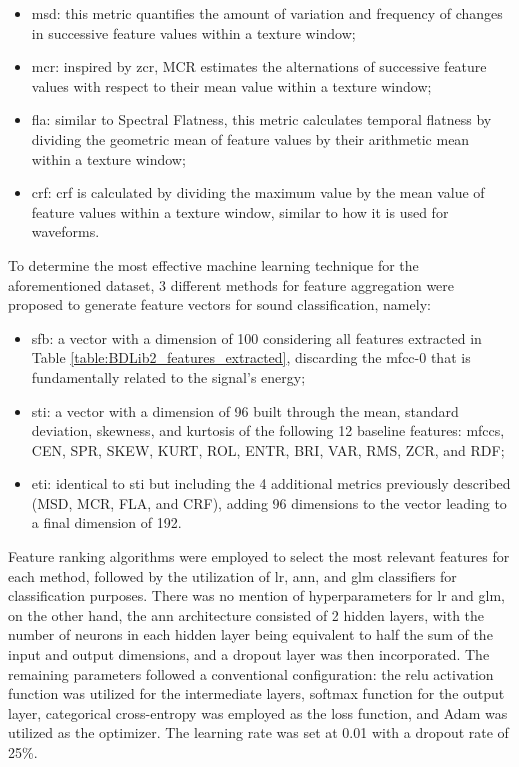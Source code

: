  \begin{itemize}
    \item \gls{msd}: this metric quantifies the amount of variation and frequency of changes in successive feature values within a texture window;
    \item \gls{mcr}: inspired by \gls{zcr}, MCR estimates the alternations of successive feature values with respect to their mean value within a texture window;
    \item \gls{fla}: similar to Spectral Flatness, this metric calculates temporal flatness by dividing the geometric mean of feature values by their arithmetic mean within a texture window;
    \item \gls{crf}:  \gls{crf} is calculated by dividing the maximum value by the mean value of feature values within a texture window, similar to how it is used for waveforms.
\end{itemize}
	
To determine the most effective machine learning technique for the aforementioned dataset, 3 different methods for feature aggregation were proposed to generate feature vectors for sound classification, namely:

\begin{itemize}
    \item \gls{sfb}: a vector with a dimension of 100 considering all features extracted in Table \ref{table:BDLib2_features_extracted}, discarding the \gls{mfcc}-0 that is fundamentally related to the signal's energy;
    \item \gls{sti}: a vector with a dimension of 96 built through the mean, standard deviation, skewness, and kurtosis of the following 12 baseline features: \gls{mfcc}s, CEN, SPR, SKEW, KURT, ROL, ENTR, BRI, VAR, RMS, ZCR, and RDF;
    \item \gls{eti}: identical to \gls{sti} but including the 4 additional metrics previously described (MSD, MCR, FLA, and CRF), adding 96 dimensions to the vector leading to a final dimension of 192.
\end{itemize}

Feature ranking algorithms were employed to select the most relevant features for each method, followed by the utilization of \gls{lr}, \gls{ann}, and \gls{glm} classifiers for classification purposes. There was no mention of hyperparameters for \gls{lr} and \gls{glm}, on the other hand, the \gls{ann} architecture consisted of 2 hidden layers, with the number of neurons in each hidden layer being equivalent to half the sum of the input and output dimensions, and a dropout layer was then incorporated. The remaining parameters followed a conventional configuration: the \gls{relu} activation function was utilized for the intermediate layers, softmax function for the output layer, categorical cross-entropy was employed as the loss function, and Adam was utilized as the optimizer. The learning rate was set at 0.01 with a dropout rate of 25\%.

